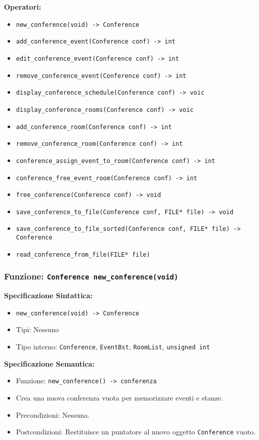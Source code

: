 \documentclass[11pt]{scrartcl} %
\begin{document}
\textbf{Operatori:}
\begin{itemize}
    \item \texttt{new\_conference(void) -> Conference}
    \item \texttt{add\_conference\_event(Conference conf) -> int}
    \item \texttt{edit\_conference\_event(Conference conf) -> int}
    \item \texttt{remove\_conference\_event(Conference conf) -> int}
    \item \texttt{display\_conference\_schedule(Conference conf) -> voic}
    \item \texttt{display\_conference\_rooms(Conference conf) -> voic}
    \item \texttt{add\_conference\_room(Conference conf) -> int}
    \item \texttt{remove\_conference\_room(Conference conf) -> int}
    \item \texttt{conference\_assign\_event\_to\_room(Conference conf) -> int}
    \item \texttt{conference\_free\_event\_room(Conference conf) -> int}
    \item \texttt{free\_conference(Conference conf) -> void}
    \item \texttt{save\_conference\_to\_file(Conference conf, FILE* file) -> void}
    \item \texttt{save\_conference\_to\_file\_sorted(Conference conf, FILE* file) -> Conference}
    \item \texttt{read\_conference\_from\_file(FILE* file)}
\end{itemize}

\subsubsection{Funzione: \texttt{Conference new\_conference(void)}}

\textbf{Specificazione Sintattica:}
\begin{itemize}
\item \texttt{new\_conference(void) -> Conference}
\item Tipi: Nessuno
\item Tipo interno: \texttt{Conference}, \texttt{EventBst}, \texttt{RoomList}, \texttt{unsigned int}
\end{itemize}

\textbf{Specificazione Semantica:}
\begin{itemize}
\item Funzione: \texttt{new\_conference() -> conferenza}
\item Crea una nuova conferenza vuota per memorizzare eventi e stanze.
\item Precondizioni: Nessuna.
\item Postcondizioni: Restituisce un puntatore al nuovo oggetto \texttt{Conference} vuoto.
\end{itemize}
\end{document}
